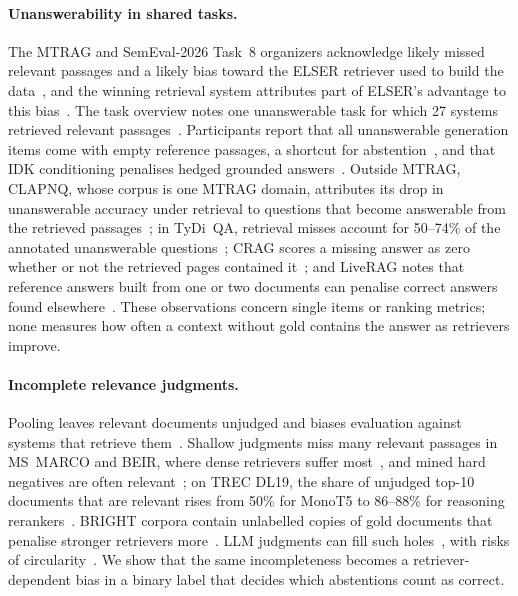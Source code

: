\documentclass[11pt]{article}
\begin{document}
\paragraph{Unanswerability in shared tasks.}
The MTRAG and SemEval-2026 Task~8 organizers acknowledge likely missed relevant passages and a likely bias toward the ELSER retriever used to build the data~\cite{katsis2025mtrag,rosenthal2026mtragun}, and the winning retrieval system attributes part of ELSER's advantage to this bias~\cite{athanasiou2026ails}. The task overview notes one unanswerable task for which 27 systems retrieved relevant passages~\cite{rosenthal2026semeval}. Participants report that all unanswerable generation items come with empty reference passages, a shortcut for abstention~\cite{bondarenko2026raguteam}, and that IDK conditioning penalises hedged grounded answers~\cite{dutra2026nlpceia}. Outside MTRAG, CLAPNQ, whose corpus is one MTRAG domain, attributes its drop in unanswerable accuracy under retrieval to questions that become answerable from the retrieved passages~\cite{rosenthal2025clapnq}; in TyDi~QA, retrieval misses account for 50--74\% of the annotated unanswerable questions~\cite{asai2021challenges}; CRAG scores a missing answer as zero whether or not the retrieved pages contained it~\cite{yang2024crag}; and LiveRAG notes that reference answers built from one or two documents can penalise correct answers found elsewhere~\cite{carmel2025liverag}. These observations concern single items or ranking metrics; none measures how often a context without gold contains the answer as retrievers improve.

\paragraph{Incomplete relevance judgments.}
Pooling leaves relevant documents unjudged and biases evaluation against systems that retrieve them~\cite{zobel1998reliable,buckley2004retrieval,yilmaz2006estimating}. Shallow judgments miss many relevant passages in MS~MARCO and BEIR, where dense retrievers suffer most~\cite{arabzadeh2022shallow,thakur2021beir}, and mined hard negatives are often relevant~\cite{qu2021rocketqa,moreira2024nvretriever,thakur2025hard}; on TREC DL19, the share of unjudged top-10 documents that are relevant rises from 50\% for MonoT5 to 86--88\% for reasoning rerankers~\cite{weller2025rank1}. BRIGHT corpora contain unlabelled copies of gold documents that penalise stronger retrievers more~\cite{sharifymoghaddam2026lighting}. LLM judgments can fill such holes~\cite{thomas2024large,upadhyay2024umbrela}, with risks of circularity~\cite{clarke2025llm}. We show that the same incompleteness becomes a retriever-dependent bias in a binary label that decides which abstentions count as correct.
\end{document}
